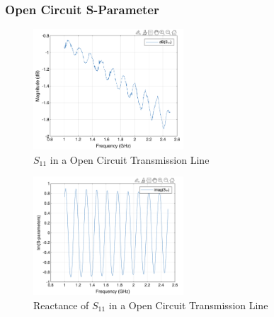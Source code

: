 \documentclass{article} %
\begin{document}
\subsubsection*{Open Circuit S-Parameter}
\begin{figure}[H]
    \centering
    \includegraphics[width=0.5\textwidth]{./image/figure6.png}
    \caption{$S_{11}$ in a Open Circuit Transmission Line}
\end{figure}
\begin{figure}[H]
    \centering
    \includegraphics[width=0.5\textwidth]{./image/figure7.png}
    \caption{Reactance of $S_{11}$ in a Open Circuit Transmission Line}
\end{figure}
\end{document}
